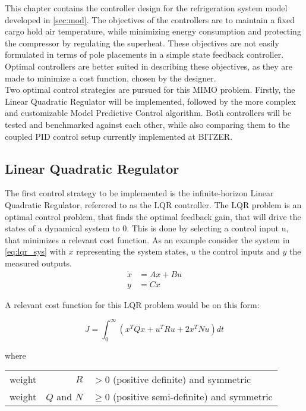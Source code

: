 This chapter contains the controller design for the refrigeration system model developed in \cref{sec:mod}. The objectives of the controllers are to maintain a fixed cargo hold air temperature, while minimizing energy consumption and protecting the compressor by regulating the superheat. These objectives are not easily formulated in terms of pole placements in a simple state feedback controller. Optimal controllers are better suited in describing these objectives, as they are made to minimize a cost function, chosen by the designer. \\

Two optimal control strategies are pursued for this MIMO problem. Firstly, the Linear Quadratic Regulator will be implemented, followed by the more complex and customizable Model Predictive Control algorithm. Both controllers will be tested and benchmarked against each other, while also comparing them to the coupled PID control setup currently implemented at BITZER.

\subsection{Linear Quadratic Regulator}
The first control strategy to be implemented is the infinite-horizon Linear Quadratic Regulator, referered to as the LQR controller. The LQR problem is an optimal control problem, that finds the optimal feedback gain, that will drive the states of a dynamical system to 0. This is done by selecting a control input u, that minimizes a relevant cost function. As an example consider the system in \cref{eq:lqr_sys} with $x$ representing the system states, $u$ the control inputs and $y$ the measured outputs.\\

\begin{equation} \label{eq:lqr_sys}
	\begin{split}
		\dot{x} 	& = Ax + Bu \\
		y 	& = Cx
	\end{split}
\end{equation}

A relevant cost function for this LQR problem would be on this form:

\begin{equation} \label{eq:lqr_cost_fcn}
	J = \int_0^{\infty} \left(x^TQx + u^TRu + 2x^TNu\right)dt
\end{equation}

where

\begin{center}
	\begin{tabular}{l r l }
		weight & $R$         & $ > 0$ (positive definite) and symmetric       \\
		weight & $Q$ and $N$ & $\ge 0$ (positive semi-definite) and symmetric
	\end{tabular}
\end{center}

